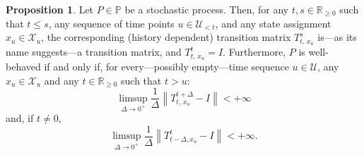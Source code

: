 \documentclass[10pt,a4paper]{paper}
\theoremstyle{definition}
\newtheorem{proposition}[theorem]{Proposition}
\newcommand{\reals}{\mathbb{R}}
\newcommand{\realspos}{\reals_{>0}}
\newcommand{\realsnonneg}{\reals_{\geq 0}}
\newcommand{\states}{\mathcal{X}}
\newcommand{\processes}{\mathbb{P}}
\newcommand{\norm}[1]{\left\lVert #1 \right\rVert}
\begin{document}
\begin{proposition}\label{prop:stochasticprocess:simpleproperties}
Let $P\in\processes$ be a stochastic process.  %
Then, for any $t,s\in\realsnonneg$ such that $t\leq s$, any sequence of time points $u\in\mathcal{U}_{<t}$, and any state assignment $x_u\in\states_u$, the corresponding (history dependent) transition matrix $T_{t,\,x_u}^s$ is---as its name suggests---a transition matrix, and $T_{t,\,x_u}^t=I$. Furthermore, $P$ is well-behaved if and only if, for every---possibly empty---time sequence $u\in\mathcal{U}$, any $x_u\in\states_u$ and any $t\in\reals_{\geq0}$ such that $t>u$:
\begin{equation}\label{eq:def:well-behaved:right:matrix}
\limsup_{\Delta\to 0^{+}}\frac{1}{\Delta}\norm{T_{t,\,x_u}^{t+\Delta}-I}<+\infty
\end{equation}
and, if $t\neq0$,
\begin{equation}\label{eq:def:well-behaved:left:matrix}
\limsup_{\Delta\to 0^{+}}\frac{1}{\Delta}\norm{T_{t-\Delta,x_u}^{t}-I}<+\infty.
\end{equation}
\end{proposition}
\end{document}
